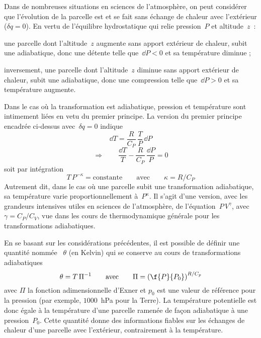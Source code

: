 \sk
Dans de nombreuses situations en sciences de l'atmosphère, on peut considérer que l'évolution de la parcelle est  et se fait sans échange de chaleur avec l'extérieur ($\delta q=0$). En vertu de l'équilibre hydrostatique qui relie pression~$P$ et altitude~$z$~:
\begin{citemize}
\item une parcelle dont l'altitude~$z$ augmente sans apport extérieur de chaleur, subit une  adiabatique, donc une détente telle que~$\dd P < 0$ et sa température diminue ;
\item inversement, une parcelle dont l'altitude~$z$ diminue sans apport extérieur de chaleur, subit une  adiabatique, donc une compression telle que~$\dd P > 0$ et sa température augmente. 
\end{citemize}

\sk
Dans le cas où la transformation est adiabatique, pression et température sont intimement liées en vetu du premier principe. La version du premier principe encadrée ci-dessus avec~$\delta q = 0$ indique
\[ \dd T = \frac{R}{C_P} \, \frac{T}{P} \, \dd P\]
\[ \Rightarrow \qquad \frac{\dd T}{T} - \frac{R}{C_P} \, \frac{\dd P}{P} = 0 \]
soit par intégration
\[ T \, P^{- \kappa} = \text{constante} \qquad \text{avec} \qquad \kappa = R / C_P \]
Autrement dit, dans le cas où une parcelle subit une transformation adiabatique, sa température varie proportionnellement à~$P^{\kappa}$. Il s'agit d'une version, avec les grandeurs intensives utiles en sciences de l'atmosphère, de l'équation~$P\,V^{\gamma}$, avec $\gamma = C_P / C_V$, vue dans les cours de thermodynamique générale pour les transformations adiabatiques.

\sk
En se basant sur les considérations précédentes, il est possible de définir une quantité nommée ~$\theta$ (en Kelvin) qui se conserve au cours de transformations adiabatiques
\[ \theta  = T \, \Pi^{-1} \qquad \textrm{avec} \qquad \Pi = \left( \f{P}{P_0} \right)^{R/C_p} \]
\noindent avec $\Pi$ la fonction adimensionnelle d'Exner et $p_0$ est une valeur de référence pour la pression (par exemple, $1000$~hPa pour la Terre). La température potentielle est donc égale à la température d'une parcelle ramenée de façon adiabatique à une pression~$P_0$. Cette quantité donne des informations fiables sur les échanges de chaleur d'une parcelle avec l'extérieur, contrairement à la température.
